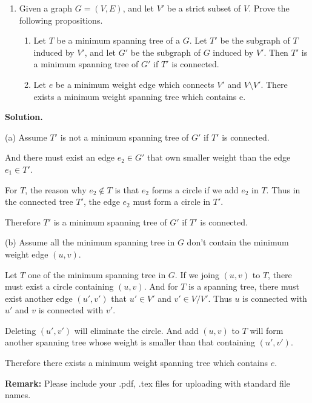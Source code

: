 \documentclass[12pt,a4paper]{article}
\theoremstyle{definition}
\begin{document}
\begin{enumerate}
	(a) The worst case is when we push a new element, the $n$ elements in the multistack are filled with the first $k$ stacks.
		And all elements are needed to be moved. The time cost is $O(n)$.

	(b) The worst time $T(n)$ in total for a sequence of $n$ operations is when the $n$ elements are stoed in the $i_{th}$ stack.

	All the elemens pushed from $stack_1$ to $stack_i$ and cost $O(i)$ time.

	And it's clear that $n=\frac{3^{i-1}-1}{2}$. Thus $i=O(\log n)$.

	Thus the amortized cost of a push operation is $\frac{nO(\log n)}{n}=O(\log n)$
	\item Given a graph $G = (V, E)$, and let $V'$ be a strict subset of $V$. Prove the following propositions.
	
	\begin{enumerate}
		\item Let $T$ be a minimum spanning tree of a $G$. Let $T'$ be the subgraph of $T$ induced by $V'$, and let $G'$ be the subgraph of $G$ induced by $V'$. Then $T'$ is a minimum spanning tree of $G'$ if $T'$ is connected.
		\item Let $e$ be a minimum weight edge which connects $V'$ and $V \setminus V'$. There exists a minimum weight spanning tree which contains e.
	\end{enumerate}
\end{enumerate}

\textbf{Solution.}

(a) Assume $T'$ is not a minimum spanning tree of $G'$ if $T'$ is connected.

And there must exist an edge $e_2\in G'$ that own smaller weight than the edge $e_1\in T'$. 

For $T$, the reason why $e_2\notin T$ is that $e_2$ forms a circle if we add $e_2$ in $T$. Thus in the connected tree $T'$, the edge $e_2$ must form a circle in $T'$.

Therefore $T'$ is a minimum spanning tree of $G'$ if $T'$ is connected.

(b) Assume all the minimum spanning tree in $G$ don't contain the minimum weight edge $(u,v)$.

Let $T$ one of the minimum spanning tree in $G$. If we joing $(u,v)$ to $T$, there must exist a circle containing $(u, v)$. And for $T$ is a spanning tree, there must exist another edge $(u', v')$ that $u'\in V'$ and $v'\in V/V'$. Thus $u$ is connected with $u'$
and $v$ is connected with $v'$.

Deleting $(u', v')$ will eliminate the circle. And add $(u, v)$ to $T$ will form another spanning tree whose weight is smaller than that containing $(u', v')$.

Therefore there exists a minimum weight spanning tree which contains $e$.

\vspace{2.1cm}
\textbf{Remark:} Please include your .pdf, .tex files for uploading with standard file names.


\end{document}
